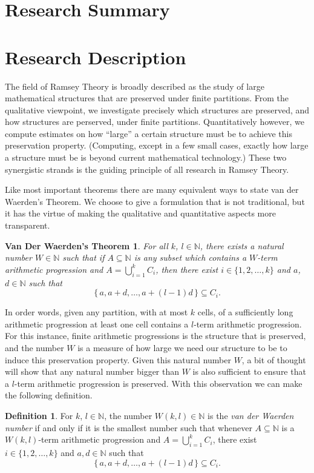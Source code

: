 \documentclass[12pt]{article}
\theoremstyle{plain}
\newtheorem*{vdw}{Van Der Waerden's Theorem}
\theoremstyle{definition}
\newtheorem*{defn}{Definition}
\newcommand{\bbN}{\mathbb{N}}
\begin{document}
\section{Research Summary}

\section{Research Description}
The field of Ramsey Theory is broadly described as the study of large
mathematical structures that are preserved under finite partitions.
From the qualitative viewpoint, we investigate precisely which
structures are preserved, and how structures are perserved, under
finite partitions.
Quantitatively however, we compute estimates on how ``large'' a
certain structure must be to achieve this preservation property. 
(Computing, except in a few small cases, exactly how large a structure
must be is beyond current mathematical technology.)
These two synergistic strands is the guiding principle of all research
in Ramsey Theory.

Like most important theorems there are many equivalent ways to state
van der Waerden's Theorem.
We choose to give a formulation that is not traditional, but it has
the virtue of making the qualitative and quantitative aspects more
transparent. 

  \begin{vdw}
    For all $k$, $l \in \bbN$, there exists a natural number $W \in
    \bbN$ such that if $A \subseteq \bbN$ is any subset which contains a
    $W$-term arithmetic progression and $A = \bigcup_{i=1}^k C_i$,
    then there exist $i \in \{1, 2, \ldots, k\}$ and $a$, $d \in \bbN$
    such that 
      \[
        \{\, a, a+d, \ldots, a+(l-1)d \,\} \subseteq C_i.
      \]
  \end{vdw}

In order words, given any partition, with at most $k$ cells, of a
sufficiently long arithmetic progression at least one cell contains a
$l$-term arithmetic progression.
For this instance, finite arithmetic progressions is the structure
that is preserved, and the number $W$ is a measure of how large we
need our structure to be to induce this preservation property.
Given this natural number $W$, a bit of thought will show that any
natural number bigger than $W$ is also sufficient to ensure that a
$l$-term arithmetic progression is preserved.
With this observation we can make the following definition.

  \begin{defn}
    For $k$, $l \in \bbN$, the number $W(k,l) \in \bbN$ is the
    \textsl{van der Waerden number} if and only if it is the smallest
    number such that whenever $A \subseteq \bbN$ is a $W(k,l)$-term
    arithmetic progression and $A = \bigcup_{i=1}^k C_i$, there exist
    $i \in \{1, 2, \ldots, k\}$ and $a, d \in \bbN$ such that
      \[
        \{\, a, a+d, \ldots, a+(l-1)d \,\} \subseteq C_i.
      \]
  \end{defn}
\end{document}
